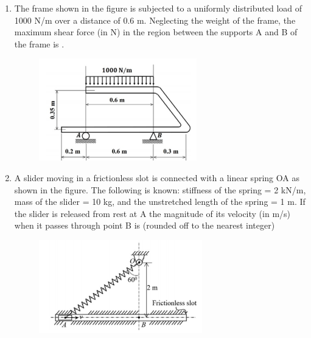 \documentclass[a4paper,10pt]{article}
\begin{document}
\begin{enumerate}
\hfill{}
\begin{enumerate}
\end{enumerate}

\item The frame shown in the figure is subjected to a uniformly distributed load of 1000 N/m over a distance of 0.6 m. Neglecting the weight of the frame, the maximum shear force (in N) in the region between the supports A and B of the frame is \underline{\hspace{2cm}}.
\begin{figure}[H]
    \centering
    \includegraphics[width=0.6\columnwidth]{q81.png}
    \caption*{}
    \label{fig:q81}
\end{figure}

\hfill{}

\item A slider moving in a frictionless slot is connected with a linear spring OA as shown in the figure. The following is known: stiffness of the spring = 2 kN/m, mass of the slider = 10 kg, and the unstretched length of the spring = 1 m. If the slider is released from rest at A the magnitude of its velocity (in m/s) when it passes through point B is \underline{\hspace{2cm}}(rounded off to the nearest integer)
\begin{figure}[H]
    \centering
    \includegraphics[width=0.6\columnwidth]{q82.png}
    \caption*{}
    \label{fig:q82}
\end{figure}


\end{enumerate}
\end{document}
